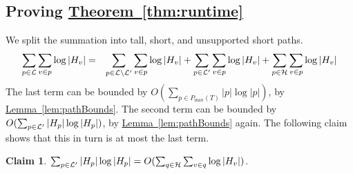 \documentclass[11pt]{article}
\newtheorem{claim}[theorem]{Claim}
\theoremstyle{definition}
\newcommand{\cH}{{\cal H}}
\newcommand{\cL}{{\cal L}}
\newcommand{\Thm}[1]{\hyperref[thm:#1]{Theorem~\ref*{thm:#1}}} %
\newcommand{\Lem}[1]{\hyperref[lem:#1]{Lemma~\ref*{lem:#1}}} %
\newcommand{\pmax}{P_{\max}}
\begin{document}
\subsection{Proving \Thm{runtime}} \label{sec:thm-runtime}

We split the summation into tall, short, and unsupported short paths.
\begin{eqnarray*} 
\sum_{p \in \cL} \sum_{v \in p} \log |H_v| & = & \sum_{p \in \cL \setminus \cL'} \sum_{v \in p} \log |H_v| + \sum_{p \in \cL'} \sum_{v \in p} \log |H_v| + \sum_{p \in \cH} \sum_{v \in p} \log |H_v|
\end{eqnarray*}
The last term can be bounded by $O(\sum_{p \in \pmax(T)} |p|\log |p|)$, by \Lem{pathBounds}.
The second term can be bounded by $O(\sum_{p \in \cL'} |H_p| \log |H_p|)$, by \Lem{pathBounds} again.
The following claim shows that this in turn is at most the last term.


\begin{claim} \label{clm:above} $\sum_{p \in \cL'} |H_p| \log |H_p| = O(\sum_{q \in \cH} \sum_{v \in q} \log |H_v|)$.
\end{claim}
\end{document}
